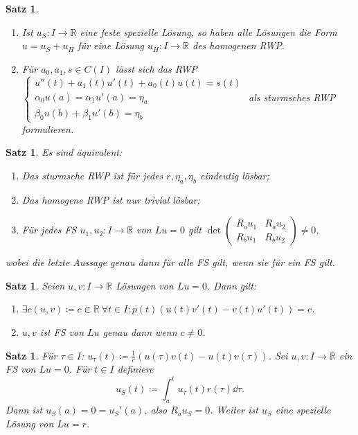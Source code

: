 \documentclass[a4paper]{article}
\theoremstyle{marginbreak}
\newtheorem{satz}[definition]{Satz}
\newcommand{\R}{\mathbb{R}}
\begin{document}
	\begin{satz}
		\begin{enumerate}[label=(\alph*)]
			\item Ist $u_S\colon I\to\R$ eine feste spezielle Lösung, so haben alle Lösungen
				die Form $u=u_S+u_H$ für eine Lösung $u_H\colon I\to\R$ des homogenen RWP.
			\item Für $a_0, a_1, s\in C(I)$ lässt sich das RWP $\begin{cases}u''(t)+a_1(t)u'(t)+a_0(t)u(t)=s(t)\\
				\alpha_0u(a)=\alpha_1u'(a)=\eta_a\\\beta_0u(b)+\beta_1u'(b)=\eta_b\end{cases}$ als sturmsches
				RWP formulieren.
		\end{enumerate}
	\end{satz}
	\begin{satz}
		Es sind äquivalent:
		\begin{enumerate}[label=(\alph*)]
			\item Das sturmsche RWP ist für jedes $r,\eta_a,\eta_b$ eindeutig lösbar;
			\item Das homogene RWP ist nur trivial lösbar;
			\item Für jedes FS $u_1, u_2\colon I\to\R$ von $Lu=0$ gilt $\det\begin{pmatrix}
				R_au_1 & R_au_2\\ R_bu_1 & R_bu_2\end{pmatrix}\neq 0$,
		\end{enumerate}
		wobei die letzte Aussage genau dann für alle FS gilt, wenn sie für ein FS gilt.
	\end{satz}
	\begin{satz}
		Seien $u, v\colon I\to\R$ Lösungen von $Lu=0$. Dann gilt:
		\begin{enumerate}[label=(\alph*)]
			\item $\exists c(u,v)\coloneqq c\in\R~\forall t\in I: p(t)(u(t)v'(t) - v(t)u'(t))=c$.
			\item $u, v$ ist FS von $Lu$ genau dann wenn $c\neq 0$.
		\end{enumerate}
	\end{satz}
	\begin{satz}
		Für $\tau\in I$: $u_\tau(t)\coloneqq\frac{1}{c}(u(\tau)v(t)-u(t)v(\tau))$.
		Sei $u, v\colon I\to\R$ ein FS von $Lu=0$. Für $t\in I$ definiere \[u_S(t)\coloneqq\int_a^tu_\tau(t)r(\tau)\dd{\tau}.\]
		Dann ist $u_S(a)=0=u_S'(a)$, also $R_au_S=0$. Weiter ist $u_S$ eine spezielle Lösung von $Lu=r$.
	\end{satz}
\end{document}
